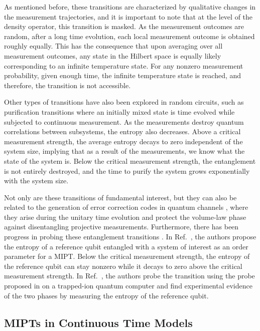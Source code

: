 As mentioned before, these transitions are characterized by qualitative changes in the measurement trajectories, and it is important to note that at the level of the density operator, this transition is masked. As the measurement outcomes are random, after a long time evolution, each local measurement outcome is obtained roughly equally. This has the consequence that upon averaging over all measurement outcomes, any state in the Hilbert space is equally likely corresponding to an infinite temperature state. For any nonzero measurement probability, given enough time, the infinite temperature state is reached, and therefore, the transition is not accessible. 

Other types of transitions have also been explored in random circuits, such as purification transitions \cite{gullans2020,bentsen2021a} where an initially mixed state is time evolved while subjected to continuous measurement. As the measurements destroy quantum correlations between subsystems, the entropy also decreases. Above a critical measurement strength, the average entropy decays to zero independent of the system size, implying that as a result of the measurements, we know what the state of the system is. Below the critical measurement strength, the entanglement is not entirely destroyed, and the time to purify the system grows exponentially with the system size.  

Not only are these transitions of fundamental interest, but they can also be related to the generation of error correction codes in quantum channels \cite{choi2020,gullans2021,fan2021,li2021}, where they arise during the unitary time evolution and protect the volume-law phase against disentangling projective measurements. Furthermore, there has been progress in probing these entanglement transitions \cite{gullans2020a,noel2022}. In Ref.~\cite{gullans2020a}, the authors propose the entropy of a reference qubit entangled with a system of interest as an order parameter for a MIPT. Below the critical measurement strength, the entropy of the reference qubit can stay nonzero while it decays to zero above the critical measurement strength. In Ref.~\cite{noel2022}, the authors probe the transition using the probe proposed in \cite{gullans2020a} on a trapped-ion quantum computer and find experimental evidence of the two phases by measuring the entropy of the reference qubit.

\subsection{MIPTs in Continuous Time Models}

